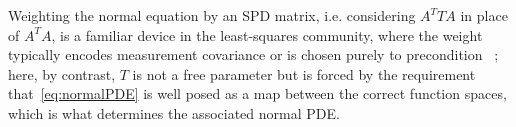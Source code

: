\documentclass[hidelinks,onefignum,onetabnum]{siamart220329}
\newcommand{\llnote}[1]{}
\newcommand{\bb}[1]{#1}
\begin{document}

\bb{Weighting the normal equation by an SPD matrix, i.e. considering
    $A^T T A$ in place of $A^T A$, is a familiar device in the
    least-squares community, where the weight typically encodes
    measurement covariance or is chosen purely to precondition~%
    \cite{scotttuma2025sparse,bjorck2024numerical}; here, by contrast,
    $T$ is not a free parameter but is forced by the requirement that~\eqref{eq:normalPDE}
    is well posed as a map between the correct function spaces,
    which is what determines the associated normal PDE.}
\end{document}
